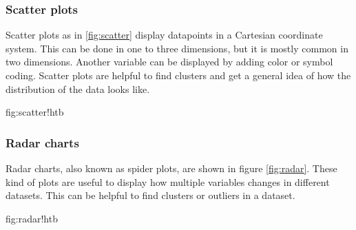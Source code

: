 	\subsubsection{Scatter plots}
		Scatter plots as in \ref{fig:scatter} display datapoints in a Cartesian coordinate system. This can be done in one to three dimensions, but it is mostly common in two dimensions. Another variable can be displayed by adding color or symbol coding. Scatter plots are helpful to find clusters and get a general idea of how the distribution of the data looks like.				
		\begin{fig}{fig:scatter}{!htb}
		\end{fig}				
	\subsubsection{Radar charts}
		Radar charts, also known as spider plots, are shown in figure \ref{fig:radar}. These kind of plots are useful to display how multiple variables changes in different datasets.	This can be helpful to find clusters or outliers in a dataset.								
		\begin{fig}{fig:radar}{!htb}
		\end{fig}		
